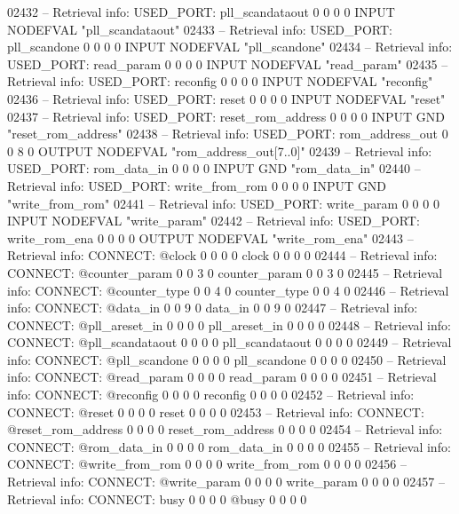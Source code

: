 \begin{DoxyCode}
{02432 \textcolor{keyword}{-- Retrieval info: USED\_PORT: pll\_scandataout 0 0 0 0 INPUT NODEFVAL "pll\_scandataout"}
02433 \textcolor{keyword}{-- Retrieval info: USED\_PORT: pll\_scandone 0 0 0 0 INPUT NODEFVAL "pll\_scandone"}
02434 \textcolor{keyword}{-- Retrieval info: USED\_PORT: read\_param 0 0 0 0 INPUT NODEFVAL "read\_param"}
02435 \textcolor{keyword}{-- Retrieval info: USED\_PORT: reconfig 0 0 0 0 INPUT NODEFVAL "reconfig"}
02436 \textcolor{keyword}{-- Retrieval info: USED\_PORT: reset 0 0 0 0 INPUT NODEFVAL "reset"}
02437 \textcolor{keyword}{-- Retrieval info: USED\_PORT: reset\_rom\_address 0 0 0 0 INPUT GND "reset\_rom\_address"}
02438 \textcolor{keyword}{-- Retrieval info: USED\_PORT: rom\_address\_out 0 0 8 0 OUTPUT NODEFVAL "rom\_address\_out[7..0]"}
02439 \textcolor{keyword}{-- Retrieval info: USED\_PORT: rom\_data\_in 0 0 0 0 INPUT GND "rom\_data\_in"}
02440 \textcolor{keyword}{-- Retrieval info: USED\_PORT: write\_from\_rom 0 0 0 0 INPUT GND "write\_from\_rom"}
02441 \textcolor{keyword}{-- Retrieval info: USED\_PORT: write\_param 0 0 0 0 INPUT NODEFVAL "write\_param"}
02442 \textcolor{keyword}{-- Retrieval info: USED\_PORT: write\_rom\_ena 0 0 0 0 OUTPUT NODEFVAL "write\_rom\_ena"}
02443 \textcolor{keyword}{-- Retrieval info: CONNECT: @clock 0 0 0 0 clock 0 0 0 0}
02444 \textcolor{keyword}{-- Retrieval info: CONNECT: @counter\_param 0 0 3 0 counter\_param 0 0 3 0}
02445 \textcolor{keyword}{-- Retrieval info: CONNECT: @counter\_type 0 0 4 0 counter\_type 0 0 4 0}
02446 \textcolor{keyword}{-- Retrieval info: CONNECT: @data\_in 0 0 9 0 data\_in 0 0 9 0}
02447 \textcolor{keyword}{-- Retrieval info: CONNECT: @pll\_areset\_in 0 0 0 0 pll\_areset\_in 0 0 0 0}
02448 \textcolor{keyword}{-- Retrieval info: CONNECT: @pll\_scandataout 0 0 0 0 pll\_scandataout 0 0 0 0}
02449 \textcolor{keyword}{-- Retrieval info: CONNECT: @pll\_scandone 0 0 0 0 pll\_scandone 0 0 0 0}
02450 \textcolor{keyword}{-- Retrieval info: CONNECT: @read\_param 0 0 0 0 read\_param 0 0 0 0}
02451 \textcolor{keyword}{-- Retrieval info: CONNECT: @reconfig 0 0 0 0 reconfig 0 0 0 0}
02452 \textcolor{keyword}{-- Retrieval info: CONNECT: @reset 0 0 0 0 reset 0 0 0 0}
02453 \textcolor{keyword}{-- Retrieval info: CONNECT: @reset\_rom\_address 0 0 0 0 reset\_rom\_address 0 0 0 0}
02454 \textcolor{keyword}{-- Retrieval info: CONNECT: @rom\_data\_in 0 0 0 0 rom\_data\_in 0 0 0 0}
02455 \textcolor{keyword}{-- Retrieval info: CONNECT: @write\_from\_rom 0 0 0 0 write\_from\_rom 0 0 0 0}
02456 \textcolor{keyword}{-- Retrieval info: CONNECT: @write\_param 0 0 0 0 write\_param 0 0 0 0}
02457 \textcolor{keyword}{-- Retrieval info: CONNECT: busy 0 0 0 0 @busy 0 0 0 0}
}
\end{DoxyCode}
